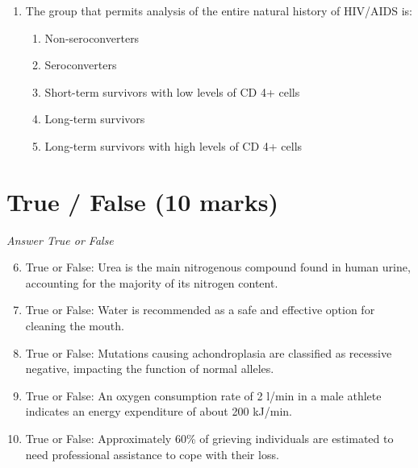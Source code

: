 \documentclass[12pt]{article}
\begin{document}
\begin{enumerate}[label=\arabic*.]
\begin{enumerate}[label=(\alph*)]
    \item Possesses only RNA
    \item A stable and unchanging genome
    \item Possesses only DNA
    \item Has a single, unsegmented genome
    \item Possesses RNA and DNA
\end{enumerate}
\item The group that permits analysis of the entire natural history of HIV/AIDS is:
\begin{enumerate}[label=(\alph*)]
    \item Non-seroconverters
    \item Seroconverters
    \item Short-term survivors with low levels of CD 4+ cells
    \item Long-term survivors
    \item Long-term survivors with high levels of CD 4+ cells
\end{enumerate}
\end{enumerate}

\section*{True / False (10 marks)}
\textit{Answer True or False}
\begin{enumerate}[label=\arabic*.]
\setcounter{enumi}{5}
\item True or False: Urea is the main nitrogenous compound found in human urine, accounting for the majority of its nitrogen content.
\item True or False: Water is recommended as a safe and effective option for cleaning the mouth.
\item True or False: Mutations causing achondroplasia are classified as recessive negative, impacting the function of normal alleles.
\item True or False: An oxygen consumption rate of 2 l/min in a male athlete indicates an energy expenditure of about 200 kJ/min.
\item True or False: Approximately 60\% of grieving individuals are estimated to need professional assistance to cope with their loss.
\end{enumerate}
\end{document}
